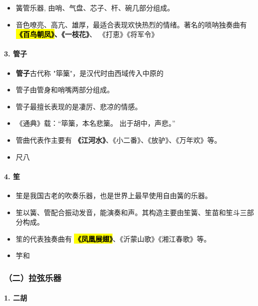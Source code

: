 \documentclass[
]{article}
\providecommand{\tightlist}{%
  \setlength{\itemsep}{0pt}\setlength{\parskip}{0pt}}
\begin{document}
\begin{itemize}
\tightlist
\item
  簧管乐器, 由哨、气盘、芯子、杆、碗几部分组成。
\item
  音色嘹亮、高亢、雄厚，最适合表现欢快热烈的情绪。著名的唢呐独奏曲有
  \textbf{\hl{\mbox{《百鸟朝凤》}}、《一枝花》}、 《打恵》《将军令》
\end{itemize}

\paragraph{3. 管子}\label{ux7ba1ux5b50}

\begin{itemize}
\item
  \textbf{管子}古代称 "筚篥"，是汉代时由西域传入中原的
\item
  管子由管身和哨嘴两部分组成。
\item
  管子最擅长表现的是凄厉、悲凉的情感。
\item
  《通典》载：``筚篥，本名悲篥。 出于胡中，声悲。''
\item
  管曲代表作主要有
  \textbf{《江河水》}、《小二番》、《放驴》、《万年欢》等。
\item
  尺八
\end{itemize}

\paragraph{4. 笙}\label{ux7b19}

\begin{itemize}
\tightlist
\item
  笙是我国古老的吹奏乐器，也是世界上最早使用自由簧的乐器。
\item
  笙以簧、管配合振动发音，能演奏和声。其构造主要由笙簧、笙苗和笙斗三部分构成。
\item
  笙的代表独奏曲有
  \hl{\mbox{\textbf{《凤凰展翅》}}}、《沂蒙山歌》《湘江春歌》等。
\item
  竽和
\end{itemize}

\subsubsection{（二）拉弦乐器}\label{ux4e8cux62c9ux5f26ux4e50ux5668}

\paragraph{1. 二胡}\label{ux4e8cux80e1}
\end{document}
